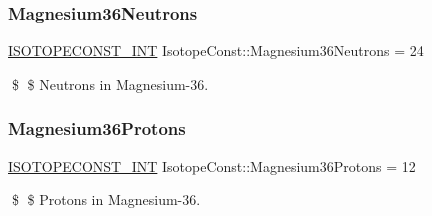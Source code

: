 \subsubsection{\texorpdfstring{Magnesium36\+Neutrons}{Magnesium36Neutrons}}
{\footnotesize\ttfamily \mbox{\hyperlink{group___isotope_const-_macros_ga5f18360b3e99483a35c32d789e62621c}{I\+S\+O\+T\+O\+P\+E\+C\+O\+N\+S\+T\+\_\+\+I\+NT}} Isotope\+Const\+::\+Magnesium36\+Neutrons = 24}

\$ \$ Neutrons in Magnesium-\/36. \mbox{\label{group___isotope_const-_magnesium-_mg36_gaa62c469a2ce6a0c90e46942a521b91c2}} 
\subsubsection{\texorpdfstring{Magnesium36\+Protons}{Magnesium36Protons}}
{\footnotesize\ttfamily \mbox{\hyperlink{group___isotope_const-_macros_ga5f18360b3e99483a35c32d789e62621c}{I\+S\+O\+T\+O\+P\+E\+C\+O\+N\+S\+T\+\_\+\+I\+NT}} Isotope\+Const\+::\+Magnesium36\+Protons = 12}

\$ \$ Protons in Magnesium-\/36. 